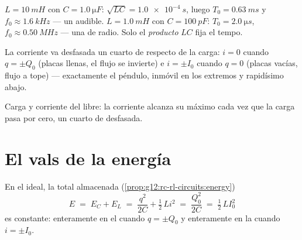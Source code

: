 \begin{example}\label{ex:g12:rlc-oscillations:firstnumbers}
$L = \qty{10}{mH}$ con $C = \qty{1.0}{\micro F}$: $\sqrt{LC} = \qty{1.0e-4}{s}$, luego
$T_0 = \qty{0.63}{ms}$ y $f_0 \approx \qty{1.6}{kHz}$ --- un  audible.
$L = \qty{1.0}{mH}$ con $C = \qty{100}{pF}$: $T_0 = \qty{2.0}{\micro s}$,
$f_0 \approx \qty{0.50}{MHz}$ --- una  de radio. Solo el \emph{producto}
$LC$ fija el tempo.
\end{example}

\begin{remark}\label{rem:g12:rlc-oscillations:quarter}
La corriente va desfasada un cuarto de  respecto de la carga: $i = 0$ cuando
$q = \pm Q_0$ (placas llenas, el flujo se invierte) e $i = \pm I_0$ cuando $q = 0$
(placas vacías, flujo a tope) --- exactamente el péndulo, inmóvil en los extremos y
rapidísimo abajo.
\end{remark}

\begin{omfigure}

{\small Carga y corriente del  libre: la corriente alcanza su máximo cada
vez que la carga pasa por cero, un cuarto de  desfasada.}
\end{omfigure}

\section{El vals de la energía}

\begin{proposition}\label{prop:g12:rlc-oscillations:energy}
En el  ideal, la  total almacenada
(\cref{prop:g12:rc-rl-circuits:energy})
\[
E \;=\; E_C + E_L \;=\; \frac{q^2}{2C} + \tfrac12\,L i^2
\;=\; \frac{Q_0^2}{2C} \;=\; \tfrac12\,L I_0^2
\]
es constante: enteramente en el  cuando $q = \pm Q_0$ y enteramente en la
 cuando $i = \pm I_0$.
\end{proposition}

